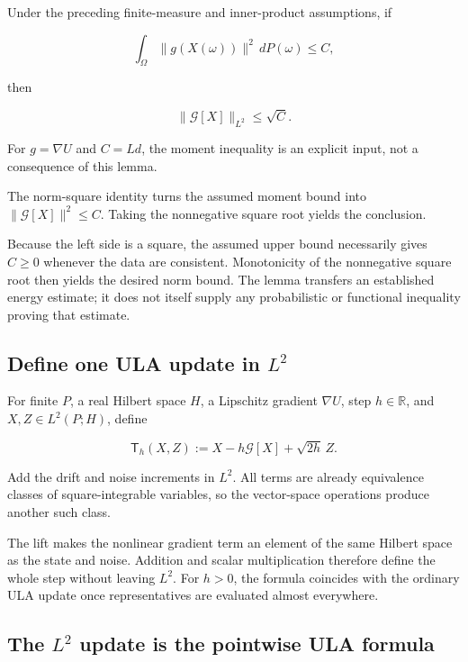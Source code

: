 \documentclass[11pt,a4paper]{article}
\begin{document}
Under the preceding finite-measure and inner-product assumptions, if

\[\int_\Omega\|g(X(\omega))\|^2\,dP(\omega)\le C,\]

then

\[\|\mathcal G[X]\|_{L^2}\le\sqrt C.\]

For \(g=\nabla U\) and \(C=Ld\), the moment inequality is an explicit input, not a consequence of this lemma.



The norm-square identity turns the assumed moment bound into \(\|\mathcal G[X]\|^2\le C\). Taking the nonnegative square root yields the conclusion.



Because the left side is a square, the assumed upper bound necessarily gives \(C\ge0\) whenever the data are consistent. Monotonicity of the nonnegative square root then yields the desired norm bound. The lemma transfers an established energy estimate; it does not itself supply any probabilistic or functional inequality proving that estimate.


\subsection{\texorpdfstring{Define one ULA update in \(L^2\)}{Define one ULA update in L²}}


For finite \(P\), a real Hilbert space \(H\), a Lipschitz gradient \(\nabla U\), step \(h\in\mathbb R\), and \(X,Z\in L^2(P;H)\), define

\[\mathsf T_h(X,Z):=X-h\mathcal G[X]+\sqrt{2h}\,Z.\]

Add the drift and noise increments in \(L^2\). All terms are already equivalence classes of square-integrable variables, so the vector-space operations produce another such class.



The lift makes the nonlinear gradient term an element of the same Hilbert space as the state and noise. Addition and scalar multiplication therefore define the whole step without leaving \(L^2\). For \(h>0\), the formula coincides with the ordinary ULA update once representatives are evaluated almost everywhere.


\subsection{\texorpdfstring{The \(L^2\) update is the pointwise ULA formula}{The L² update is the pointwise ULA formula}}
\end{document}
